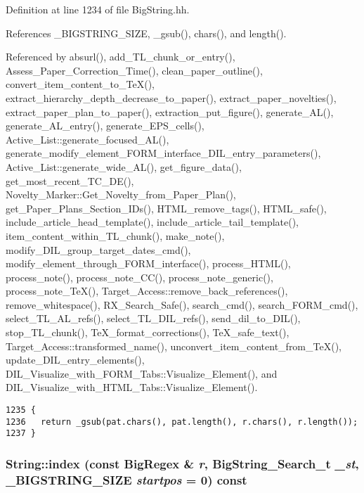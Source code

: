 Definition at line 1234 of file Big\-String.hh.

References \_\-BIGSTRING\_\-SIZE, \_\-gsub(), chars(), and length().

Referenced by absurl(), add\_\-TL\_\-chunk\_\-or\_\-entry(), Assess\_\-Paper\_\-Correction\_\-Time(), clean\_\-paper\_\-outline(), convert\_\-item\_\-content\_\-to\_\-Te\-X(), extract\_\-hierarchy\_\-depth\_\-decrease\_\-to\_\-paper(), extract\_\-paper\_\-novelties(), extract\_\-paper\_\-plan\_\-to\_\-paper(), extraction\_\-put\_\-figure(), generate\_\-AL(), generate\_\-AL\_\-entry(), generate\_\-EPS\_\-cells(), Active\_\-List::generate\_\-focused\_\-AL(), generate\_\-modify\_\-element\_\-FORM\_\-interface\_\-DIL\_\-entry\_\-parameters(), Active\_\-List::generate\_\-wide\_\-AL(), get\_\-figure\_\-data(), get\_\-most\_\-recent\_\-TC\_\-DE(), Novelty\_\-Marker::Get\_\-Novelty\_\-from\_\-Paper\_\-Plan(), get\_\-Paper\_\-Plans\_\-Section\_\-IDs(), HTML\_\-remove\_\-tags(), HTML\_\-safe(), include\_\-article\_\-head\_\-template(), include\_\-article\_\-tail\_\-template(), item\_\-content\_\-within\_\-TL\_\-chunk(), make\_\-note(), modify\_\-DIL\_\-group\_\-target\_\-dates\_\-cmd(), modify\_\-element\_\-through\_\-FORM\_\-interface(), process\_\-HTML(), process\_\-note(), process\_\-note\_\-CC(), process\_\-note\_\-generic(), process\_\-note\_\-Te\-X(), Target\_\-Access::remove\_\-back\_\-references(), remove\_\-whitespace(), RX\_\-Search\_\-Safe(), search\_\-cmd(), search\_\-FORM\_\-cmd(), select\_\-TL\_\-AL\_\-refs(), select\_\-TL\_\-DIL\_\-refs(), send\_\-dil\_\-to\_\-DIL(), stop\_\-TL\_\-chunk(), Te\-X\_\-format\_\-corrections(), Te\-X\_\-safe\_\-text(), Target\_\-Access::transformed\_\-name(), unconvert\_\-item\_\-content\_\-from\_\-Te\-X(), update\_\-DIL\_\-entry\_\-elements(), DIL\_\-Visualize\_\-with\_\-FORM\_\-Tabs::Visualize\_\-Element(), and DIL\_\-Visualize\_\-with\_\-HTML\_\-Tabs::Visualize\_\-Element().



\footnotesize\begin{verbatim}1235 {
1236   return _gsub(pat.chars(), pat.length(), r.chars(), r.length());
1237 }
\end{verbatim}\normalsize 
{}
\subsubsection{ String::index (const {\bf Big\-Regex} \& {\em r}, {\bf Big\-String\_\-Search\_\-t} {\em \_\-st}, {\bf \_\-BIGSTRING\_\-SIZE} {\em startpos} = 0) const\hspace{0.3cm}{\tt  [inline]}}\label{classString_a31}




